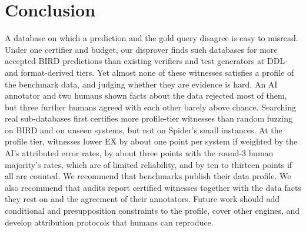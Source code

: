 \section{Conclusion}\label{sec:conclusion}
A database on which a prediction and the gold query disagree is easy to misread. Under one certifier and budget, our disprover finds such databases for more accepted BIRD predictions than existing verifiers and test generators at DDL- and format-derived tiers. Yet almost none of these witnesses satisfies a profile of the benchmark data, and judging whether they are evidence is hard. An AI annotator and two humans shown facts about the data rejected most of them, but three further humans agreed with each other barely above chance. Searching real sub-databases first certifies more profile-tier witnesses than random fuzzing on BIRD and on unseen systems, but not on Spider's small instances. At the profile tier, witnesses lower EX by about one point per system if weighted by the AI's attributed error rates, by about three points with the round-3 human majority's rates, which are of limited reliability, and by ten to thirteen points if all are counted. We recommend that benchmarks publish their data profile. We also recommend that audits report certified witnesses together with the data facts they rest on and the agreement of their annotators. Future work should add conditional and presupposition constraints to the profile, cover other engines, and develop attribution protocols that humans can reproduce.
\label{endconclusion}
